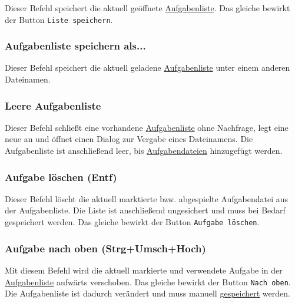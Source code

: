 \documentclass[a4paper,DIV=11
]{scrartcl}
\begin{document}
Dieser Befehl speichert die aktuell geöffnete
\protect\hyperlink{aufgabenlisten}{Aufgabenliste}. Das gleiche bewirkt
der Button \texttt{Liste\ speichern}.

\hypertarget{aufgabenliste-speichern-als}{%
\subsubsection{Aufgabenliste speichern
als...}\label{aufgabenliste-speichern-als}}

Dieser Befehl speichert die aktuell geladene
\protect\hyperlink{aufgabenlisten}{Aufgabenliste} unter einem anderen
Dateinamen.

\hypertarget{leere-aufgabenliste}{%
\subsubsection{Leere Aufgabenliste}\label{leere-aufgabenliste}}

Dieser Befehl schließt eine vorhandene
\protect\hyperlink{aufgabenlisten}{Aufgabenliste} ohne Nachfrage, legt
eine neue an und öffnet einen Dialog zur Vergabe eines Dateinamens. Die Aufgabenliste ist anschließend leer, bis
\protect\hyperlink{aufgabendateien}{Aufgabendateien} hinzugefügt werden.

\hypertarget{aufgabe-luxf6schen-entf}{%
\subsubsection{Aufgabe löschen (Entf)}\label{aufgabe-luxf6schen-entf}}

Dieser Befehl löscht die aktuell marktierte bzw. abgespielte
Aufgabendatei aus der Aufgabenliste. Die Liste ist anschließend
ungesichert und muss bei Bedarf gespeichert werden. Das gleiche bewirkt der Button \texttt{Aufgabe\ löschen}.

\hypertarget{aufgabe-nach-oben-strgumschhoch}{%
\subsubsection{Aufgabe nach oben
(Strg+Umsch+Hoch)}\label{aufgabe-nach-oben-strgumschhoch}}

Mit diesem Befehl wird die aktuell markierte und verwendete Aufgabe in
der \protect\hyperlink{aufgabenlisten}{Aufgabenliste} aufwärts
verschoben. Das gleiche bewirkt der Button \texttt{Nach\ oben}. Die
Aufgabenliste ist dadurch verändert und muss manuell
\protect\hyperlink{AufgabenlisteSpeichern}{gespeichert} werden.
\end{document}
